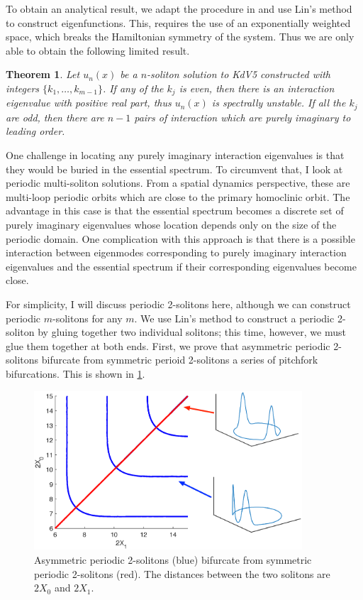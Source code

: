 \documentclass[12pt,reqno]{amsart}
\newtheorem{theorem}{Theorem}
\theoremstyle{definition}
\theoremstyle{remark}
\begin{document}
To obtain an analytical result, we adapt the procedure in \cite{Sandstede1998} and use Lin's method to construct eigenfunctions. This, requires the use of an exponentially weighted space, which breaks the Hamiltonian symmetry of the system. Thus we are only able to obtain the following limited result.

\begin{theorem}\label{KdV5unstable}
Let $u_n(x)$ be a $n$-soliton solution to KdV5 constructed with integers $\{ k_1, \dots, k_{m-1} \}$. If any of the $k_j$ is even, then there is an interaction eigenvalue with positive real part, thus $u_n(x)$ is spectrally unstable. If all the $k_j$ are odd, then there are $n-1$ pairs of interaction which are purely imaginary to leading order.
\end{theorem} 

One challenge in locating any purely imaginary interaction eigenvalues is that they would be buried in the essential spectrum. To circumvent that, I look at periodic multi-soliton solutions. From a spatial dynamics perspective, these are multi-loop periodic orbits which are close to the primary homoclinic orbit. The advantage in this case is that the essential spectrum becomes a discrete set of purely imaginary eigenvalues whose location depends only on the size of the periodic domain. One complication with this approach is that there is a possible interaction between eigenmodes corresponding to purely imaginary interaction eigenvalues and the essential spectrum if their corresponding eigenvalues become close. 

For simplicity, I will discuss periodic 2-solitons here, although we can construct periodic $m$-solitons for any $m$. We use Lin's method to construct a periodic 2-soliton by gluing together two individual solitons; this time, however, we must glue them together at both ends. First, we prove that asymmetric periodic 2-solitons bifurcate from symmetric perioid 2-solitons a series of pitchfork bifurcations. This is shown in \cref{fig:perpitchfork}.

\begin{figure}[ht]
\begin{center}
\includegraphics[width=10cm]{periodicpitchforklabeled.eps}
\caption{Asymmetric periodic 2-solitons (blue) bifurcate from symmetric periodic 2-solitons (red). The distances between the two solitons are $2X_0$ and $2X_1$.
}
\label{fig:perpitchfork}
\end{center}
\end{figure}
\end{document}
